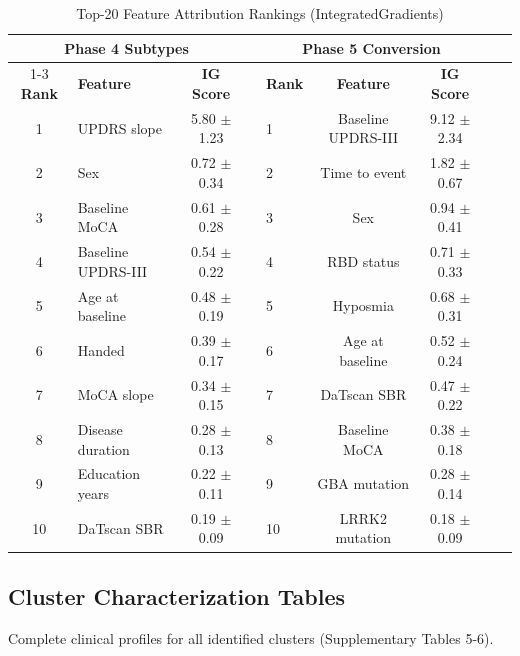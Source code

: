 \documentclass[11pt]{article}
\begin{document}
\begin{table}[H]
\centering
\caption{Top-20 Feature Attribution Rankings (IntegratedGradients)}
\label{tab:supp_attribution_full}
\begin{tabular}{clcclcclc}
\toprule
\multicolumn{3}{c}{\textbf{Phase 4 Subtypes}} & & \multicolumn{3}{c}{\textbf{Phase 5 Conversion}} \\
\cmidrule{1-3} \cmidrule{5-7}
\textbf{Rank} & \textbf{Feature} & \textbf{IG Score} & & \textbf{Rank} & \textbf{Feature} & \textbf{IG Score} \\
\midrule
1 & UPDRS slope & 5.80 $\pm$ 1.23 & & 1 & Baseline UPDRS-III & 9.12 $\pm$ 2.34 \\
2 & Sex & 0.72 $\pm$ 0.34 & & 2 & Time to event & 1.82 $\pm$ 0.67 \\
3 & Baseline MoCA & 0.61 $\pm$ 0.28 & & 3 & Sex & 0.94 $\pm$ 0.41 \\
4 & Baseline UPDRS-III & 0.54 $\pm$ 0.22 & & 4 & RBD status & 0.71 $\pm$ 0.33 \\
5 & Age at baseline & 0.48 $\pm$ 0.19 & & 5 & Hyposmia & 0.68 $\pm$ 0.31 \\
6 & Handed & 0.39 $\pm$ 0.17 & & 6 & Age at baseline & 0.52 $\pm$ 0.24 \\
7 & MoCA slope & 0.34 $\pm$ 0.15 & & 7 & DaTscan SBR & 0.47 $\pm$ 0.22 \\
8 & Disease duration & 0.28 $\pm$ 0.13 & & 8 & Baseline MoCA & 0.38 $\pm$ 0.18 \\
9 & Education years & 0.22 $\pm$ 0.11 & & 9 & GBA mutation & 0.28 $\pm$ 0.14 \\
10 & DaTscan SBR & 0.19 $\pm$ 0.09 & & 10 & LRRK2 mutation & 0.18 $\pm$ 0.09 \\
\bottomrule
\end{tabular}
\end{table}

\subsection{Cluster Characterization Tables}

Complete clinical profiles for all identified clusters (Supplementary Tables 5-6).
\end{document}
